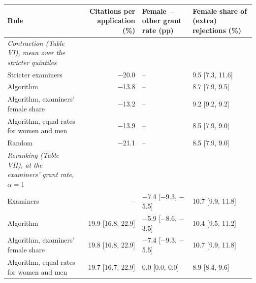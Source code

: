 \begin{tabular}{lrll}
\toprule
Rule & Citations per application (\%) & Female $-$ other grant rate (pp) & Female share of (extra) rejections (\%) \\
\midrule
\emph{Contraction (Table VI), mean over the stricter quintiles} &  &  &  \\
Stricter examiners & $-$20.0 & -- & 9.5 [7.3, 11.6] \\
Algorithm & $-$13.8 & -- & 8.7 [7.9, 9.5] \\
Algorithm, examiners' female share & $-$13.2 & -- & 9.2 [9.2, 9.2] \\
Algorithm, equal rates for women and men & $-$13.9 & -- & 8.5 [7.9, 9.0] \\
Random & $-$21.1 & -- & 8.5 [7.9, 9.0] \\
\emph{Reranking (Table VII), at the examiners' grant rate, $\alpha = 1$} &  &  &  \\
Examiners & -- & $-$7.4 [$-$9.3, $-$5.5] & 10.7 [9.9, 11.8] \\
Algorithm & 19.9 [16.8, 22.9] & $-$5.9 [$-$8.6, $-$3.5] & 10.4 [9.5, 11.2] \\
Algorithm, examiners' female share & 19.8 [16.8, 22.9] & $-$7.4 [$-$9.3, $-$5.5] & 10.7 [9.9, 11.8] \\
Algorithm, equal rates for women and men & 19.7 [16.7, 22.9] & 0.0 [0.0, 0.0] & 8.9 [8.4, 9.6] \\
\bottomrule
\end{tabular}
